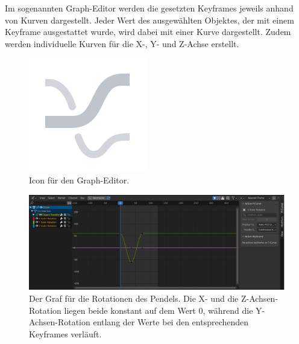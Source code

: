 \documentclass[
]{book}
\let\oldmarginnote\marginnote
\renewcommand{\marginnote}[1]{%
  \oldmarginnote{{\footnotesize\selectfont #1}}%
}
\begin{document}
\marginnote{Graph-Editor}

Im sogenannten Graph-Editor werden die gesetzten Keyframes jeweils
anhand von Kurven dargestellt. Jeder Wert des ausgewählten Objektes, der
mit einem Keyframe ausgestattet wurde, wird dabei mit einer Kurve
dargestellt. Zudem werden individuelle Kurven für die X-, Y- und Z-Achse
erstellt.

\begin{figure}

\includegraphics{Chapters/Images/Chapter_48/48_1_Icon_Graph_Editor.png}

\caption{\label{fig-1_1}Icon für den Graph-Editor.}

\end{figure}%

\begin{figure}

\includegraphics{Chapters/Images/Chapter_48/48_2_Pendel_Rotation.jpg}

\caption{\label{fig-1_2}Der Graf für die Rotationen des Pendels. Die X-
und die Z-Achsen-Rotation liegen beide konstant auf dem Wert 0, während
die Y-Achsen-Rotation entlang der Werte bei den entsprechenden Keyframes
verläuft.}

\end{figure}%
\end{document}
